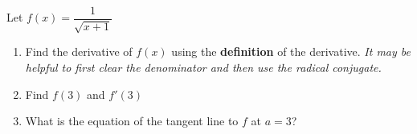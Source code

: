 \documentclass[12pt]{article}
\begin{document}
 
Let $f(x) = \dfrac{1}{\sqrt{x+1}}$
\begin{enumerate}
\item Find the derivative of $f(x)$ using the \textbf{definition} of the derivative. \emph{It may be helpful to first clear the denominator and then use the radical conjugate.}
\vfill

\item Find $f(3)$ and $f'(3)$
\vspace{1in}

\item What is the equation of the tangent line to $f$ at $a=3$?
\vspace{1in}

\end{enumerate}
\end{document}
